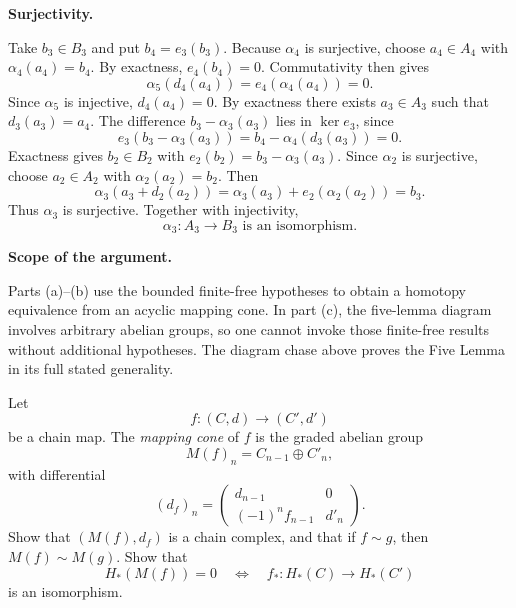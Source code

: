 \begin{solution}
\medskip
\noindent\textbf{Surjectivity.}\par\smallskip
Take \(b_3\in B_3\) and put \(b_4=e_3(b_3)\).
Because \(\alpha_4\) is surjective, choose \(a_4\in A_4\)
with \(\alpha_4(a_4)=b_4\).
By exactness, \(e_4(b_4)=0\). Commutativity then gives
\[
\alpha_5(d_4(a_4))=e_4(\alpha_4(a_4))=0.
\]
Since \(\alpha_5\) is injective, \(d_4(a_4)=0\). By exactness
there exists \(a_3\in A_3\) such that \(d_3(a_3)=a_4\).
The difference \(b_3-\alpha_3(a_3)\) lies in \(\ker e_3\), since
\[
e_3(b_3-\alpha_3(a_3))=b_4-\alpha_4(d_3(a_3))=0.
\]
Exactness gives \(b_2\in B_2\) with
\(e_2(b_2)=b_3-\alpha_3(a_3)\). Since \(\alpha_2\) is surjective,
choose \(a_2\in A_2\) with \(\alpha_2(a_2)=b_2\). Then
\[
\alpha_3(a_3+d_2(a_2))
=\alpha_3(a_3)+e_2(\alpha_2(a_2))=b_3.
\]
Thus \(\alpha_3\) is surjective. Together with injectivity,
\[
\boxed{\alpha_3:A_3\longrightarrow B_3\text{ is an isomorphism}.}
\]

\medskip
\noindent\textbf{Scope of the argument.}\par\smallskip
Parts (a)--(b) use the bounded finite-free hypotheses to obtain a
homotopy equivalence from an acyclic mapping cone. In part (c), the
five-lemma diagram involves arbitrary abelian groups, so one cannot
invoke those finite-free results without additional hypotheses. The
diagram chase above proves the Five Lemma in its full stated generality.
\end{solution}

\begin{problem}
Let
\[
f:(C,d)\to (C',d')
\]
be a chain map. The \emph{mapping cone} of \(f\) is the graded abelian group
\[
M(f)_n=C_{n-1}\oplus C'_n,
\]
with differential
\[
(d_f)_n=
\begin{pmatrix}
	d_{n-1} & 0\\
	(-1)^n f_{n-1} & d'_n
\end{pmatrix}.
\]
Show that \((M(f),d_f)\) is a chain complex, and that if \(f\sim g\), then \(M(f)\sim M(g)\). Show that
\[
H_*(M(f))=0
\quad\Longleftrightarrow\quad
f_*:H_*(C)\to H_*(C')
\]
is an isomorphism.

\par
\end{problem}

